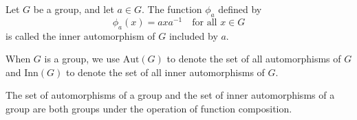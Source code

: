  \begin{definition}
     Let $G$ be a group, and let $a \in G$. The function $\phi_a$ defined by 
     \[
         \phi_a(x) = axa^{-1} \quad \text{for all } x \in G
     \]
     is called the inner automorphism of $G$ included by $a$.
 
     When $G$ is a group, we use $\text{Aut}(G)$ to denote the set of all automorphisms of $G$ and 
     $\text{Inn}(G)$ to denote the set of all inner automorphisms of $G$.
 \end{definition}
 
 \begin{theorem}
     The set of automorphisms of a group and the set of inner automorphisms of a group are both groups under the 
     operation of function composition.
 \end{theorem}

